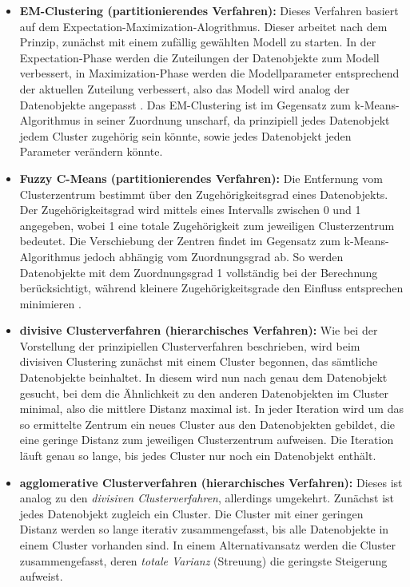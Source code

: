 \begin{itemize}
\newpage		
		
		\item \textbf{EM-Clustering (partitionierendes Verfahren):} Dieses Verfahren basiert auf dem Expectation-Maximization-Alogrithmus. Dieser arbeitet nach dem Prinzip, zunächst mit einem zufällig gewählten Modell zu starten. In der Expectation-Phase werden die Zuteilungen der Datenobjekte zum Modell verbessert, in Maximization-Phase werden die Modellparameter entsprechend der aktuellen Zuteilung verbessert, also das Modell wird analog der Datenobjekte angepasst . Das EM-Clustering ist im Gegensatz zum k-Means-Algorithmus in seiner Zuordnung unscharf, da prinzipiell jedes Datenobjekt jedem Cluster zugehörig sein könnte, sowie jedes Datenobjekt jeden Parameter verändern könnte.  
		\item \textbf{Fuzzy C-Means (partitionierendes Verfahren):} Die Entfernung vom Clusterzentrum bestimmt über den Zugehörigkeitsgrad eines Datenobjekts. Der Zugehörigkeitsgrad wird mittels eines Intervalls zwischen 0 und 1 angegeben, wobei 1 eine totale Zugehörigkeit zum jeweiligen Clusterzentrum bedeutet. Die Verschiebung der Zentren findet im Gegensatz zum k-Means-Algorithmus jedoch abhängig vom Zuordnungsgrad ab. So werden Datenobjekte mit dem Zuordnungsgrad 1 vollständig bei der Berechnung berücksichtigt, während kleinere Zugehörigkeitsgrade den Einfluss entsprechen minimieren .
		\item \textbf{divisive Clusterverfahren (hierarchisches Verfahren):} Wie bei der Vorstellung der prinzipiellen Clusterverfahren beschrieben, wird beim divisiven Clustering zunächst mit einem Cluster begonnen, das sämtliche Datenobjekte beinhaltet. In diesem wird nun nach genau dem Datenobjekt gesucht, bei dem die Ähnlichkeit zu den anderen Datenobjekten im Cluster minimal, also die mittlere Distanz maximal ist. In jeder Iteration wird um das so ermittelte Zentrum ein neues Cluster aus den Datenobjekten gebildet, die eine geringe Distanz zum jeweiligen Clusterzentrum aufweisen. Die Iteration läuft genau so lange, bis jedes Cluster nur noch ein Datenobjekt enthält.      
		\item \textbf{agglomerative Clusterverfahren (hierarchisches Verfahren):} Dieses ist analog zu den \textit{divisiven Clusterverfahren}, allerdings umgekehrt. Zunächst ist jedes Datenobjekt zugleich ein Cluster. Die Cluster mit einer geringen Distanz werden so lange iterativ zusammengefasst, bis alle Datenobjekte in einem Cluster vorhanden sind. In einem Alternativansatz werden die Cluster zusammengefasst, deren \textit{totale Varianz} (Streuung) die geringste Steigerung aufweist. 

\end{itemize}
